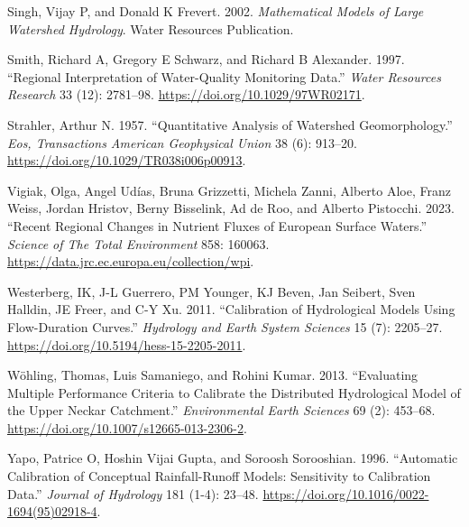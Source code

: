 \begin{CSLReferences}{1}{0}
\leavevmode{}%
Singh, Vijay P, and Donald K Frevert. 2002. \emph{Mathematical Models of Large Watershed Hydrology}. Water Resources Publication.

\leavevmode{}%
Smith, Richard A, Gregory E Schwarz, and Richard B Alexander. 1997. {``Regional Interpretation of Water-Quality Monitoring Data.''} \emph{Water Resources Research} 33 (12): 2781--98. \url{https://doi.org/10.1029/97WR02171}.

\leavevmode{}%
Strahler, Arthur N. 1957. {``Quantitative Analysis of Watershed Geomorphology.''} \emph{Eos, Transactions American Geophysical Union} 38 (6): 913--20. \url{https://doi.org/10.1029/TR038i006p00913}.

\leavevmode{}%
Vigiak, Olga, Angel Udías, Bruna Grizzetti, Michela Zanni, Alberto Aloe, Franz Weiss, Jordan Hristov, Berny Bisselink, Ad de Roo, and Alberto Pistocchi. 2023. {``Recent Regional Changes in Nutrient Fluxes of European Surface Waters.''} \emph{Science of The Total Environment} 858: 160063. \url{https://data.jrc.ec.europa.eu/collection/wpi}.

\leavevmode{}%
Westerberg, IK, J-L Guerrero, PM Younger, KJ Beven, Jan Seibert, Sven Halldin, JE Freer, and C-Y Xu. 2011. {``Calibration of Hydrological Models Using Flow-Duration Curves.''} \emph{Hydrology and Earth System Sciences} 15 (7): 2205--27. \url{https://doi.org/10.5194/hess-15-2205-2011}.

\leavevmode{}%
Wöhling, Thomas, Luis Samaniego, and Rohini Kumar. 2013. {``Evaluating Multiple Performance Criteria to Calibrate the Distributed Hydrological Model of the Upper Neckar Catchment.''} \emph{Environmental Earth Sciences} 69 (2): 453--68. \url{https://doi.org/10.1007/s12665-013-2306-2}.

\leavevmode{}%
Yapo, Patrice O, Hoshin Vijai Gupta, and Soroosh Sorooshian. 1996. {``Automatic Calibration of Conceptual Rainfall-Runoff Models: Sensitivity to Calibration Data.''} \emph{Journal of Hydrology} 181 (1-4): 23--48. \url{https://doi.org/10.1016/0022-1694(95)02918-4}.

\end{CSLReferences}


